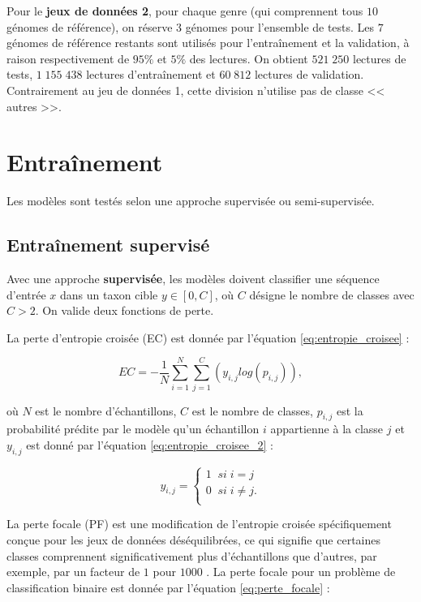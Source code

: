 Pour le \textbf{jeux de données 2}, pour chaque genre (qui comprennent tous $10$ génomes de
référence), on réserve $3$ génomes pour l'ensemble de tests. Les $7$ génomes de référence restants
sont utilisés pour l'entraînement et la validation, à raison respectivement de $95\%$ et $5\%$ des
lectures. On obtient $521\;250$ lectures de tests, $1\;155\;438$ lectures d'entraînement et
$60\;812$ lectures de validation. Contrairement au jeu de données 1, cette division n'utilise pas de
classe << autres >>.

\section{Entraînement}
Les modèles sont testés selon une approche supervisée ou semi-supervisée.

\subsection{Entraînement supervisé}

Avec une approche \textbf{supervisée}, les modèles doivent classifier une séquence d'entrée $x$ dans
un taxon cible $y \in [0, C]$, où $C$ désigne le nombre de classes avec $C > 2$. On valide deux
fonctions de perte.

La perte d'entropie croisée (EC) \cite{lecun2015} est donnée par l'équation
\ref{eq:entropie_croisee} :

\begin{equation}
    EC = - \frac{1}{N} \sum_{i=1}^N \sum_{j=1}^C \left( y_{i, j} log(p_{i, j}) \right),
    \label{eq:entropie_croisee}
\end{equation}

où $N$ est le nombre d'échantillons, $C$ est le nombre de classes, $p_{i, j}$ est la probabilité
prédite par le modèle qu'un échantillon $i$ appartienne à la classe $j$ et $y_{i, j}$ est donné
par l'équation \ref{eq:entropie_croisee_2} :

\begin{equation}
    y_{i, j} =
    \begin{cases}
        1 \;\; si \; i = j \\
        0 \;\; si \; i \neq j. \\
    \end{cases}
    \label{eq:entropie_croisee_2}
\end{equation}

La perte focale (PF) est une modification de l'entropie croisée spécifiquement conçue pour les jeux
de données déséquilibrées, ce qui signifie que certaines classes comprennent significativement plus
d'échantillons que d'autres, par exemple, par un facteur de $1$ pour $1000$ \cite{pf2017}. La perte
focale pour un problème de classification binaire est donnée par l'équation \ref{eq:perte_focale} :

